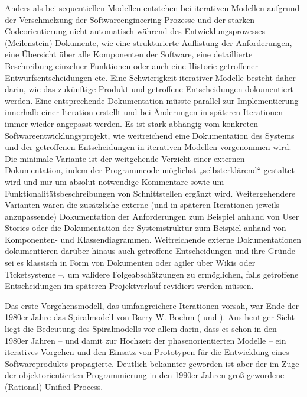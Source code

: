Anders als bei sequentiellen Modellen entstehen bei iterativen Modellen aufgrund der Verschmelzung der Softwareengineering-Prozesse und der starken Codeorientierung nicht automatisch während des Entwicklungsprozesses (Meilenstein)-Dokumente, wie eine strukturierte Auflistung der Anforderungen, eine Übersicht über alle Komponenten der Software, eine detaillierte Beschreibung einzelner Funktionen oder auch eine Historie getroffener Entwurfsentscheidungen etc. Eine Schwierigkeit iterativer Modelle besteht daher darin, wie das zukünftige Produkt und getroffene Entscheidungen dokumentiert werden. Eine entsprechende Dokumentation müsste parallel zur Implementierung innerhalb einer Iteration erstellt und bei Änderungen in späteren Iterationen immer wieder angepasst werden. Es ist stark abhängig vom konkreten Softwareentwicklungsprojekt, wie weitreichend eine Dokumentation des Systems und der getroffenen Entscheidungen in iterativen Modellen vorgenommen wird. Die minimale Variante ist der weitgehende Verzicht einer externen Dokumentation, indem der Programmcode möglichst „selbsterklärend“ gestaltet wird und nur um absolut notwendige Kommentare sowie um Funktionalitätsbeschreibungen von Schnitt\-stellen ergänzt wird. Weitergehendere Varianten wären die zusätzliche externe (und in späteren Iterationen jeweils anzupassende) Dokumentation der Anforderungen zum Beispiel anhand von User Stories oder die Dokumentation der Systemstruktur zum Beispiel anhand von Komponenten- und Klassendiagrammen. %
Weitreichende externe Dokumentationen dokumentieren darüber hinaus auch getroffene Entscheidungen und ihre Gründe – sei es klassisch in Form von Dokumenten oder agiler über Wikis oder Ticketsysteme –, um validere Folgeabschätzungen zu ermöglichen, falls getroffene Entscheidungen im späteren Projektverlauf revidiert werden müssen.

Das erste Vorgehensmodell, das umfangreichere Iterationen vorsah, war Ende der 1980er Jahre das Spiralmodell von Barry W. Boehm (\cite{boe86} und \cite{boe88}). Aus heutiger Sicht liegt die Bedeutung des Spiralmodells vor allem darin, dass es schon in den 1980er Jahren – und damit zur Hochzeit der phasenorientierten Modelle – ein iteratives Vorgehen und den Einsatz von Prototypen für die Entwicklung eines Softwareprodukts propagierte. Deutlich bekannter geworden ist aber der  im Zuge der objektorientierten Programmierung in den 1990er Jahren groß gewordene (Rational) Unified Process.


